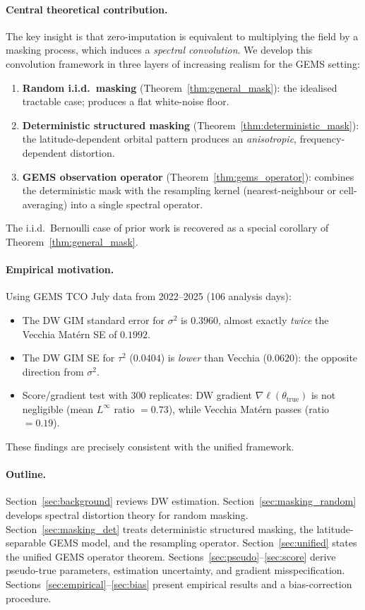 \documentclass[12pt]{article}
\begin{document}
\paragraph{Central theoretical contribution.}
The key insight is that zero-imputation is equivalent to multiplying
the field by a masking process, which induces a \emph{spectral convolution}.
We develop this convolution framework in three layers of increasing
realism for the GEMS setting:
\begin{enumerate}
  \item \textbf{Random i.i.d.\ masking} (Theorem~\ref{thm:general_mask}):
        the idealised tractable case; produces a flat white-noise floor.
  \item \textbf{Deterministic structured masking}
        (Theorem~\ref{thm:deterministic_mask}):
        the latitude-dependent orbital pattern produces an
        \emph{anisotropic}, frequency-dependent distortion.
  \item \textbf{GEMS observation operator}
        (Theorem~\ref{thm:gems_operator}):
        combines the deterministic mask with the resampling kernel
        (nearest-neighbour or cell-averaging) into a single spectral
        operator.
\end{enumerate}
The i.i.d.\ Bernoulli case of prior work is recovered as a special
corollary of Theorem~\ref{thm:general_mask}.

\paragraph{Empirical motivation.}
Using GEMS TCO July data from 2022--2025 (106 analysis days):
\begin{itemize}
  \item The DW GIM standard error for $\sigma^2$ is $0.3960$,
        almost exactly \emph{twice} the Vecchia Matérn SE of $0.1992$.
  \item The DW GIM SE for $\tau^2$ ($0.0404$) is \emph{lower} than
        Vecchia ($0.0620$): the opposite direction from $\sigma^2$.
  \item Score/gradient test with 300 replicates: DW gradient
        $\nabla\ell(\theta_{\mathrm{true}})$ is not negligible
        (mean $L^\infty$ ratio $= 0.73$), while Vecchia Matérn passes
        (ratio $= 0.19$).
\end{itemize}
These findings are precisely consistent with the unified framework.

\paragraph{Outline.}
Section~\ref{sec:background} reviews DW estimation.
Section~\ref{sec:masking_random} develops spectral distortion theory
for random masking.
Section~\ref{sec:masking_det} treats deterministic structured masking,
the latitude-separable GEMS model, and the resampling operator.
Section~\ref{sec:unified} states the unified GEMS operator theorem.
Sections~\ref{sec:pseudo}--\ref{sec:score} derive pseudo-true parameters,
estimation uncertainty, and gradient misspecification.
Sections~\ref{sec:empirical}--\ref{sec:bias} present empirical results
and a bias-correction procedure.
\end{document}
